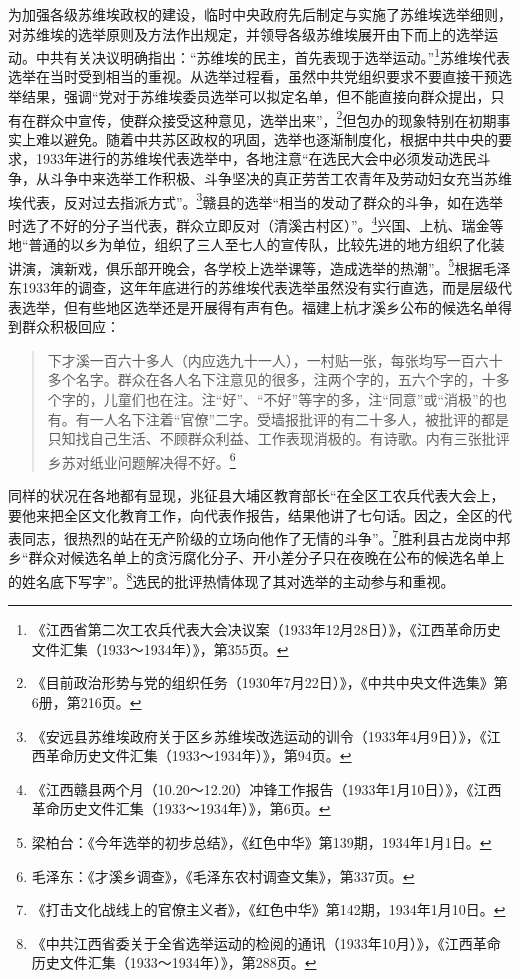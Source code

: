 为加强各级苏维埃政权的建设，临时中央政府先后制定与实施了苏维埃选举细则，对苏维埃的选举原则及方法作出规定，并领导各级苏维埃展开由下而上的选举运动。中共有关决议明确指出：“苏维埃的民主，首先表现于选举运动。”\footnote{《江西省第二次工农兵代表大会决议案（1933年12月28日）》，《江西革命历史文件汇集（1933～1934年）》，第355页。}苏维埃代表选举在当时受到相当的重视。从选举过程看，虽然中共党组织要求不要直接干预选举结果，强调“党对于苏维埃委员选举可以拟定名单，但不能直接向群众提出，只有在群众中宣传，使群众接受这种意见，选举出来”，\footnote{《目前政治形势与党的组织任务（1930年7月22日）》，《中共中央文件选集》第6册，第216页。}但包办的现象特别在初期事实上难以避免。随着中共苏区政权的巩固，选举也逐渐制度化，根据中共中央的要求，1933年进行的苏维埃代表选举中，各地注意“在选民大会中必须发动选民斗争，从斗争中来选举工作积极、斗争坚决的真正劳苦工农青年及劳动妇女充当苏维埃代表，反对过去指派方式”。\footnote{《安远县苏维埃政府关于区乡苏维埃改选运动的训令（1933年4月9日）》，《江西革命历史文件汇集（1933～1934年）》，第94页。}赣县的选举“相当的发动了群众的斗争，如在选举时选了不好的分子当代表，群众立即反对（清溪古村区）”。\footnote{《江西赣县两个月（10.20～12.20）冲锋工作报告（1933年1月10日）》，《江西革命历史文件汇集（1933～1934年）》，第6页。}兴国、上杭、瑞金等地“普通的以乡为单位，组织了三人至七人的宣传队，比较先进的地方组织了化装讲演，演新戏，俱乐部开晚会，各学校上选举课等，造成选举的热潮”。\footnote{梁柏台：《今年选举的初步总结》，《红色中华》第139期，1934年1月1日。}根据毛泽东1933年的调查，这年年底进行的苏维埃代表选举虽然没有实行直选，而是层级代表选举，但有些地区选举还是开展得有声有色。福建上杭才溪乡公布的候选名单得到群众积极回应：

\begin{quote}

下才溪一百六十多人（内应选九十一人），一村贴一张，每张均写一百六十多个名字。群众在各人名下注意见的很多，注两个字的，五六个字的，十多个字的，儿童们也在注。注“好”、“不好”等字的多，注“同意”或“消极”的也有。有一人名下注着“官僚”二字。受墙报批评的有二十多人，被批评的都是只知找自己生活、不顾群众利益、工作表现消极的。有诗歌。内有三张批评乡苏对纸业问题解决得不好。\footnote{毛泽东：《才溪乡调查》，《毛泽东农村调查文集》，第337页。}
\end{quote}


同样的状况在各地都有显现，兆征县大埔区教育部长“在全区工农兵代表大会上，要他来把全区文化教育工作，向代表作报告，结果他讲了七句话。因之，全区的代表同志，很热烈的站在无产阶级的立场向他作了无情的斗争”。\footnote{《打击文化战线上的官僚主义者》，《红色中华》第142期，1934年1月10日。}胜利县古龙岗中邦乡“群众对候选名单上的贪污腐化分子、开小差分子只在夜晚在公布的候选名单上的姓名底下写字”。\footnote{《中共江西省委关于全省选举运动的检阅的通讯（1933年10月）》，《江西革命历史文件汇集（1933～1934年）》，第288页。}选民的批评热情体现了其对选举的主动参与和重视。


